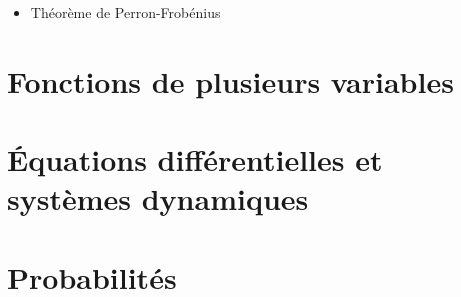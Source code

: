 \documentclass[french, 12pt]{report}
\numberwithin{exercise}{section}
\numberwithin{equation}{section}
\begin{document}
\begin{itemize}
  \item Théorème de Perron-Frobénius
\end{itemize}

\chapter{Fonctions de plusieurs variables}

\chapter{\'Equations différentielles et systèmes dynamiques}

\chapter{Probabilités}



\end{document}
